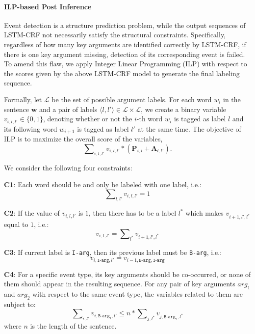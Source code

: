 \paragraph{ILP-based Post Inference}
Event detection is a structure prediction problem, while the output sequences of LSTM-CRF not necessarily satisfy the structural constraints. Specifically, regardless of how many key arguments are identified correctly by LSTM-CRF, if there is one key argument missing, detection of its corresponding event is failed. To amend this flaw, we apply Integer Linear Programming (ILP) with respect to the scores given by the above LSTM-CRF model to generate the final labeling sequence.

Formally, let $\mathcal{L}$ be the set of possible argument labels. For each word $w_i$ in the sentence $\bm{w}$ and a pair of labels $ \langle l, l' \rangle \in \mathcal{L} \times \mathcal{L}$, we create a binary variable ${v_{i,l,l'} \in \{0, 1\}}$, denoting whether or not the $i$-th word $w_i$ is tagged as label $l$ and its following word $w_{i+1}$ is tagged as label $l'$ at the same time. The objective of ILP is to maximize the overall score of the variables,
\begin{displaymath}
	\sum\nolimits_{i, l, l'}v_{i,l,l'} * (\textbf{P}_{i,l}+\textbf{A}_{l,l'}) .
\end{displaymath}

We consider the following four constraints:

\textbf{C1}: Each word should be and only be labeled with one label, i.e.:
\begin{equation}
	\sum\nolimits_{l,l'}v_{i,l,l'}=1
\end{equation}

\textbf{C2}: If the value of $v_{i,l,l'}$ is $1$, then there has to be a label $l^*$ which makes $v_{i+1,l',l^*}$ equal to $1$, i.e.:
\begin{equation}
	v_{i,l,l'} = \sum\nolimits_{l^*}v_{i+1,l',l^*}
\end{equation}

\textbf{C3}: If current label is \texttt{I-arg}, then its previous label must be \texttt{B-arg}, i.e.:
\begin{equation}
	v_{i,\texttt{I-arg},l'} = v_{i-1,\texttt{B-arg},\texttt{I-arg}}
\end{equation}

\textbf{C4}: For a specific event type, its key arguments should be co-occurred, or none of them should appear in the resulting sequence. For any pair of key arguments $arg_1$ and $arg_2$ with respect to the same event type, the variables related to them are subject to:
\begin{equation}
	\sum\nolimits_{i,l'}{v_{i,\texttt{B-arg}_1,l'}} \leq n * \sum\nolimits_{j,l^*}{v_{j,\texttt{B-arg}_2,l^*}}
\end{equation}
where $n$ is the length of the sentence.

